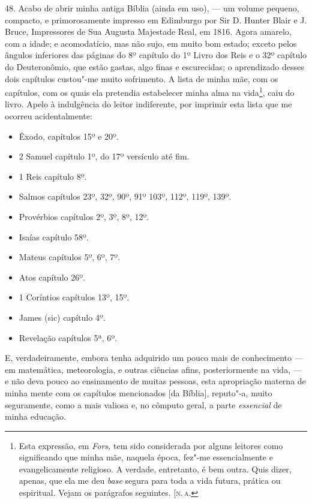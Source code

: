 48. Acabo de abrir minha antiga Bíblia (ainda em uso), --- um volume
pequeno, compacto, e primorosamente impresso em Edimburgo por Sir D.
Hunter Blair e J. Bruce, Impressores de Sua Augusta Majestade Real, em
1816. Agora amarelo, com a idade; e acomodatício, mas não sujo, em muito
bom estado; exceto pelos ângulos inferiores das páginas do 8º capítulo
do 1º Livro dos Reis e o 32º capítulo do Deuteronômio, que estão gastas,
algo finas e escurecidas; o aprendizado desses dois capítulos custou"-me
muito sofrimento. A lista de minha mãe, com os capítulos, com os quais
ela pretendia estabelecer minha alma na vida\footnote{Esta expressão, em
  \emph{Fors,} tem sido considerada por alguns leitores como
  significando que minha mãe, naquela época, fez"-me essencialmente e
  evangelicamente religioso. A verdade, entretanto, é bem outra. Quis
  dizer, apenas, que ela me deu \emph{base} segura para toda a vida
  futura, prática ou espiritual. Vejam os parágrafos seguintes. {[}\textsc{n.\,a.}}, caiu do livro. Apelo à indulgência do leitor indiferente, por
imprimir esta lista que me ocorreu acidentalmente: %

\begin{itemize}
\item[]Êxodo, capítulos 15º e 20º.

\item[]2 Samuel capítulo 1º, do 17º versículo até fim.

\item[]1 Reis capítulo 8º.

\item[]Salmos capítulos 23º, 32º, 90º, 91º 103º, 112º, 119º, 139º.

\item[]Provérbios capítulos 2º, 3º, 8º, 12º.

\item[]Isaías capítulo 58º.

\item[]Mateus capítulos 5º, 6º, 7º.

\item[]Atos capítulo 26º.

\item[]1 Coríntios capítulos 13º, 15º.

\item[]James (sic) capítulo 4º.

\item[]Revelação capítulos 5ª, 6º.
\end{itemize}

\noindent{}E, verdadeiramente, embora tenha adquirido um pouco mais de conhecimento
--- em matemática, meteorologia, e outras ciências afins, posteriormente
na vida, --- e não deva pouco ao ensinamento de muitas pessoas, esta
apropriação materna de minha mente com os capítulos mencionados {[}da
Bíblia{]}, reputo"-a, muito seguramente, como a mais valiosa e, no
cômputo geral, a parte \emph{essencial} de minha educação.

